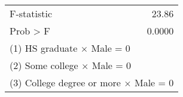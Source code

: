\begin{tabular}{lr}
\toprule
F-statistic &     23.86 \\
Prob > F &    0.0000 \\
\bottomrule
\multicolumn{2}{l}{\footnotesize (1) HS graduate $\times$ Male = 0}\\
\multicolumn{2}{l}{\footnotesize (2) Some college $\times$ Male = 0}\\
\multicolumn{2}{l}{\footnotesize (3) College degree or more $\times$ Male = 0}\\
\end{tabular}
